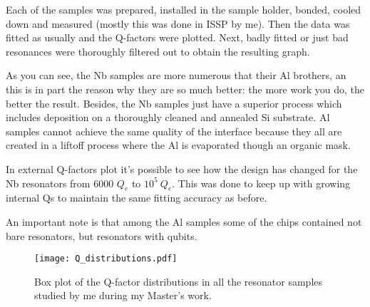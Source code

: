 \documentclass[12pt, twoside]{report}
\numberwithin{equation}{section}
\begin{document}
Each of the samples was prepared, installed in the sample holder, bonded, cooled down and measured (mostly this was done in ISSP by me). Then the data was fitted as usually and the Q-factors were plotted. Next, badly fitted or just bad resonances were thoroughly filtered out to obtain the resulting graph.

As you can see, the Nb samples are more numerous that their Al brothers, an this is in part the reason why they are so much better: the more work you do, the better the result. Besides, the Nb samples just have a superior process which includes deposition on a thoroughly cleaned and annealed Si substrate. Al samples cannot achieve the same quality of the interface because they all are created in a liftoff process where the Al is evaporated though an organic mask.

In external Q-factors plot it's possible to see how the design has changed for the Nb resonators from 6000 $Q_e$ to $10^5\ Q_e$. This was done to keep up with growing internal Qs to maintain the same fitting accuracy as before.

An important note is that among the Al samples some of the chips contained not bare resonators, but resonators with qubits.

\begin{figure}
\texttt{[image: Q\_distributions.pdf]}
\caption{Box plot of the Q-factor distributions in all the resonator samples studied by me during my Master's work.}
\label{fig:q_distributuions}
\end{figure}




\end{document}

